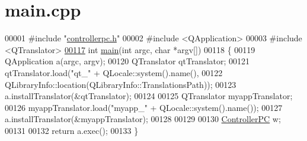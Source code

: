 \hypertarget{main_8cpp_source}{}\section{main.\+cpp}

\begin{DoxyCode}
00001 \textcolor{preprocessor}{#include "\hyperlink{controllerpc_8h}{controllerpc.h}"}
00002 \textcolor{preprocessor}{#include <QApplication>}
00003 \textcolor{preprocessor}{#include <QTranslator>}
\hypertarget{main_8cpp_source.tex_l00117}{}\hyperlink{main_8cpp_a0ddf1224851353fc92bfbff6f499fa97}{00117} \textcolor{keywordtype}{int} \hyperlink{main_8cpp_a0ddf1224851353fc92bfbff6f499fa97}{main}(\textcolor{keywordtype}{int} argc, \textcolor{keywordtype}{char} *argv[])
00118 \{
00119     QApplication a(argc, argv);
00120     QTranslator qtTranslator;
00121     qtTranslator.load(\textcolor{stringliteral}{"qt\_"} + QLocale::system().name(),
00122             QLibraryInfo::location(QLibraryInfo::TranslationsPath));
00123     a.installTranslator(&qtTranslator);
00124 
00125     QTranslator myappTranslator;
00126     myappTranslator.load(\textcolor{stringliteral}{"myapp\_"} + QLocale::system().name());
00127     a.installTranslator(&myappTranslator);
00128 
00129 
00130     \hyperlink{class_controller_p_c}{ControllerPC} w;
00131 
00132     \textcolor{keywordflow}{return} a.exec();
00133 \}
\end{DoxyCode}
